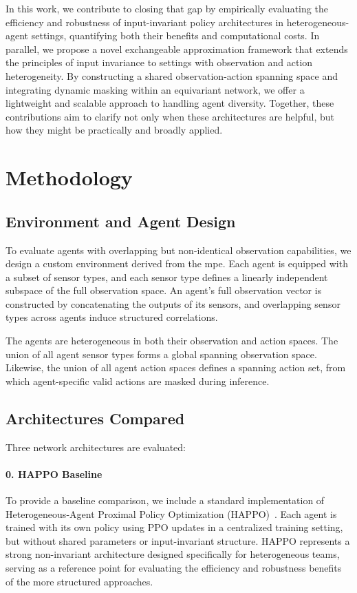 In this work, we contribute to closing that gap by empirically evaluating the efficiency 
and robustness of input-invariant policy architectures in heterogeneous-agent settings, 
quantifying both their benefits and computational costs. In parallel, we 
propose a novel exchangeable approximation framework that extends the principles 
of input invariance to settings with observation and action heterogeneity. 
By constructing a shared observation-action spanning space and integrating dynamic 
masking within an equivariant network, we offer a lightweight and scalable 
approach to handling agent diversity. Together, these contributions aim to 
clarify not only when these architectures are helpful, 
but how they might be practically and broadly applied.


\section{Methodology}
\label{con2:sec:methodology}

\subsection{Environment and Agent Design}

To evaluate agents with overlapping but non-identical observation capabilities, 
we design a custom environment derived from the \gls{mpe}. 
Each agent is equipped with a subset of sensor types, 
and each sensor type defines a linearly independent subspace of the 
full observation space. An agent's full observation vector is constructed by 
concatenating the outputs of its sensors, and overlapping sensor types across 
agents induce structured correlations.

The agents are heterogeneous in both their observation and action spaces. 
The union of all agent sensor types forms a global spanning observation space. 
Likewise, the union of all agent action spaces defines a spanning action set, 
from which agent-specific valid actions are masked during inference.

\subsection{Architectures Compared}
Three network architectures are evaluated:

\paragraph{0. HAPPO Baseline}
To provide a baseline comparison, we include a standard implementation 
of Heterogeneous-Agent Proximal Policy Optimization (HAPPO)~\cite{zhong2024}. 
Each agent is trained with its own policy using PPO updates in a centralized 
training setting, but without shared parameters or input-invariant structure. 
HAPPO represents a strong non-invariant architecture designed specifically 
for heterogeneous teams, serving as a reference point for evaluating the 
efficiency and robustness benefits of the more structured approaches.

